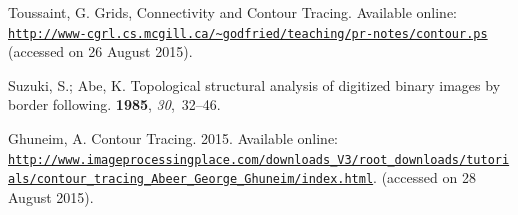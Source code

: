 \documentclass[sensors,article,accept,moreauthors,pdftex,10pt,a4paper]{mdpi}
\begin{document}
\begin{thebibliography}{999}
Toussaint, G.
\newblock Grids, Connectivity and Contour Tracing.
\newblock
 Available online: \href{http://www-cgrl.cs.mcgill.ca/~godfried/teaching/pr-notes/contour.ps}{\nolinkurl{http://www-cgrl.cs.mcgill.ca/~godfried/teaching/pr-notes/contour.ps}} (accessed on 26 August 2015).

Suzuki, S.; Abe, K.
\newblock Topological structural analysis of digitized binary images by border
 following.
 {\bf 1985},
 {\em 30},~32--46.

Ghuneim, A.
\newblock Contour Tracing. 2015.
\newblock
 Available online: \href{http://www.imageprocessingplace.com/downloads\_V3/root\_downloads/tutorials/contour\_tracing\_Abeer\_George\_Ghuneim/index.html}
 {\nolinkurl{http://www.imageprocessingplace.com/downloads\_V3/root\_downloads/tutorials/contour\_tracing\_Abeer\_George\_Ghuneim/index.html}}.
(accessed on 28 August 2015).

\end{thebibliography}



%


%
\end{document}
